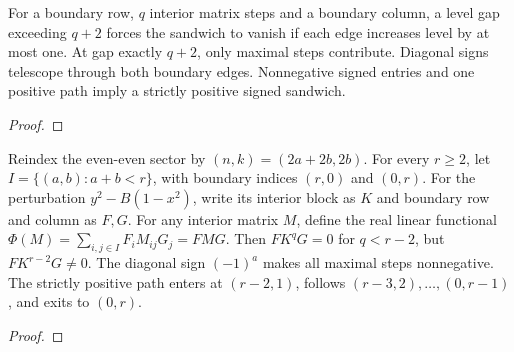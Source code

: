 \begin{supporting}
\begin{theorem}
\label{thm:maximal-sandwich-paths}
\leanok
For a boundary row, $q$ interior matrix steps and a boundary column, a level gap exceeding $q+2$ forces the sandwich to vanish if each edge increases level by at most one. At gap exactly $q+2$, only maximal steps contribute. Diagonal signs telescope through both boundary edges. Nonnegative signed entries and one positive path imply a strictly positive signed sandwich.
\end{theorem}
\begin{proof}
\leanok
\end{proof}

\begin{theorem}
\label{thm:disk-all-degree-path}
\leanok
Reindex the even-even sector by $(n,k)=(2a+2b,2b)$. For every $r\ge2$, let $I=\{(a,b):a+b<r\}$, with boundary indices $(r,0)$ and $(0,r)$. For the perturbation $y^2-B(1-x^2)$, write its interior block as $K$ and boundary row and column as $F,G$. For any interior matrix $M$, define the real linear functional
$\Phi(M)=\sum_{i,j\in I}F_iM_{ij}G_j=FMG$.
Then $FK^qG=0$ for $q<r-2$, but $FK^{r-2}G\ne0$. The diagonal sign $(-1)^a$ makes all maximal steps nonnegative. The strictly positive path enters at $(r-2,1)$, follows $(r-3,2),\ldots,(0,r-1)$, and exits to $(0,r)$.
\end{theorem}
\begin{proof}
\leanok
\end{proof}


\end{supporting}
